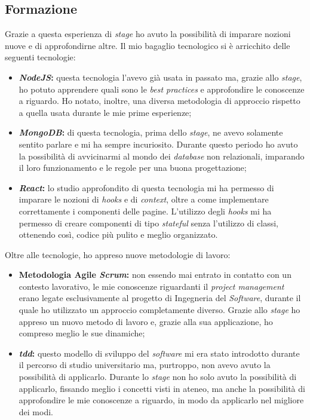 \subsection{Formazione}
Grazie a questa esperienza di \emph{stage} ho avuto la possibilità di imparare nozioni nuove e di approfondirne altre.
Il mio bagaglio tecnologico si è arricchito delle seguenti tecnologie:
\begin{itemize}
  \item \textbf{\emph{NodeJS}:} questa tecnologia l'avevo già usata in passato ma, grazie allo \emph{stage}, ho potuto apprendere quali sono le \emph{best practices} e approfondire le conoscenze a riguardo. Ho notato, inoltre, una diversa metodologia di approccio rispetto a quella usata durante le mie prime esperienze;
  \item \textbf{\emph{MongoDB}:} di questa tecnologia, prima dello \emph{stage}, ne avevo solamente sentito parlare e mi ha sempre incuriosito. Durante questo periodo ho avuto la possibilità di avvicinarmi al mondo dei \emph{database} non relazionali, imparando il loro funzionamento e le regole per una buona progettazione;
  \item \textbf{\emph{React}:} lo studio approfondito di questa tecnologia mi ha permesso di imparare le nozioni di \emph{hooks} e di \emph{context}, oltre a come implementare correttamente i componenti delle pagine. L'utilizzo degli \emph{hooks} mi ha permesso di creare componenti di tipo \emph{stateful} senza l'utilizzo di classi, ottenendo così, codice più pulito e meglio organizzato.
\end{itemize}

Oltre alle tecnologie, ho appreso nuove metodologie di lavoro:
\begin{itemize}
  \item \textbf{Metodologia Agile \emph{Scrum}:} non essendo mai entrato in contatto con un contesto lavorativo, le mie conoscenze riguardanti il \emph{project management} erano legate esclusivamente al progetto di Ingegneria del \emph{Software}, durante il quale ho utilizzato un approccio completamente diverso. Grazie allo \emph{stage} ho appreso un nuovo metodo di lavoro e, grazie alla sua applicazione, ho compreso meglio le sue dinamiche;
  \item \textbf{\emph{\acrlong{tdd}}:} questo modello di sviluppo del \emph{software} mi era stato introdotto durante il percorso di studio universitario ma, purtroppo, non avevo avuto la possibilità di applicarlo. Durante lo \emph{stage} non ho solo avuto la possibilità di applicarlo, fissando meglio i concetti visti in ateneo, ma anche la possibilità di approfondire le mie conoscenze a riguardo, in modo da applicarlo nel migliore dei modi.
\end{itemize}

